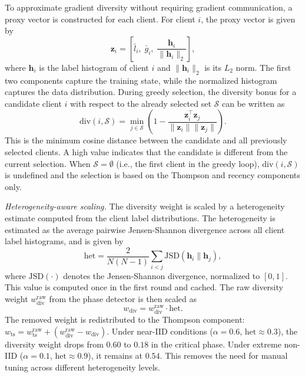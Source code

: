 \documentclass[journal]{IEEEtran}
\begin{document}
To approximate gradient diversity without requiring gradient communication, a proxy vector is constructed for each client. For client $i$, the proxy vector is given by
\begin{equation}
\bm{z}_i = \left[\bar{l}_i, \; \bar{g}_i, \; \frac{\bm{h}_i}{\|\bm{h}_i\|_2}\right],
\label{eq:proxy}
\end{equation}
where $\bm{h}_i$ is the label histogram of client $i$ and $\|\bm{h}_i\|_2$ is its $L_2$ norm. The first two components capture the training state, while the normalized histogram captures the data distribution. During greedy selection, the diversity bonus for a candidate client $i$ with respect to the already selected set $\mathcal{S}$ can be written as
\begin{equation}
\text{div}(i, \mathcal{S}) = \min_{j \in \mathcal{S}} \left(1 - \frac{\bm{z}_i^\top \bm{z}_j}{\|\bm{z}_i\| \|\bm{z}_j\|}\right).
\label{eq:div_bonus}
\end{equation}
This is the minimum cosine distance between the candidate and all previously selected clients. A high value indicates that the candidate is different from the current selection. When $\mathcal{S} = \emptyset$ (i.e., the first client in the greedy loop), $\text{div}(i, \mathcal{S})$ is undefined and the selection is based on the Thompson and recency components only.

\textit{Heterogeneity-aware scaling.} The diversity weight is scaled by a heterogeneity estimate computed from the client label distributions. The heterogeneity is estimated as the average pairwise Jensen-Shannon divergence \cite{lin1991divergence} across all client label histograms, and is given by
\begin{equation}
\text{het} = \frac{2}{N(N-1)} \sum_{i < j} \text{JSD}(\bm{h}_i \| \bm{h}_j),
\label{eq:het}
\end{equation}
where $\text{JSD}(\cdot)$ denotes the Jensen-Shannon divergence, normalized to $[0, 1]$. This value is computed once in the first round and cached. The raw diversity weight $w_{\text{div}}^{\text{raw}}$ from the phase detector is then scaled as
\begin{equation}
w_{\text{div}} = w_{\text{div}}^{\text{raw}} \cdot \text{het}.
\label{eq:het_scale}
\end{equation}
The removed weight is redistributed to the Thompson component: $w_{\text{ts}} = w_{\text{ts}}^{\text{raw}} + (w_{\text{div}}^{\text{raw}} - w_{\text{div}})$. Under near-IID conditions ($\alpha = 0.6$, $\text{het} \approx 0.3$), the diversity weight drops from $0.60$ to $0.18$ in the critical phase. Under extreme non-IID ($\alpha = 0.1$, $\text{het} \approx 0.9$), it remains at $0.54$. This removes the need for manual tuning across different heterogeneity levels.
\end{document}

